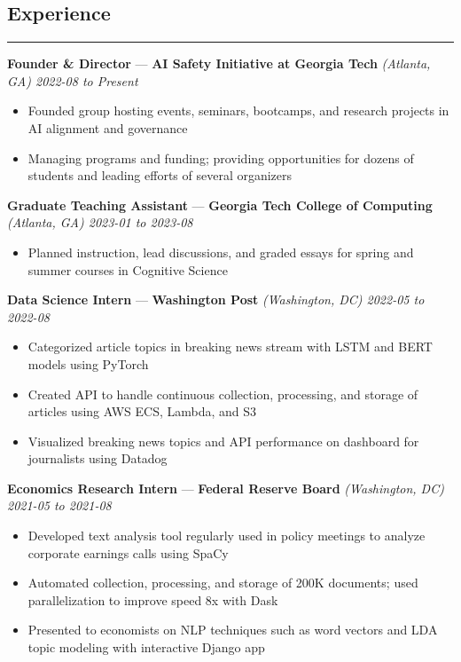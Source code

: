 \documentclass[10pt]{article}
\newcommand{\resumeHeading}[1]{
    \subsection*{#1}
    \hrule
    \vspace*{5pt}
}
\newcommand{\resumeSubHeading}[5]{
    \vspace*{5pt}
    \textbf{#1} — \textbf{#2} \textsl{(#3) \hfill #4 to #5}
}
\begin{document}

\resumeHeading{Experience \vspace{-2.5pt}}

\resumeSubHeading
    {Founder \& Director}
    {AI Safety Initiative at Georgia Tech}
    {Atlanta, GA}
    {2022-08}
    {Present}
\begin{itemize}
    \item Founded group hosting events, seminars, bootcamps, and research projects in AI alignment and governance
    \item Managing programs and funding; providing opportunities for dozens of students and leading efforts of several organizers
\end{itemize}

\resumeSubHeading
    {Graduate Teaching Assistant}
    {Georgia Tech College of Computing}
    {Atlanta, GA}
    {2023-01}
    {2023-08}
\begin{itemize}
    \item Planned instruction, lead discussions, and graded essays for spring and summer courses in Cognitive Science
\end{itemize}

\resumeSubHeading
    {Data Science Intern}
    {Washington Post}
    {Washington, DC}
    {2022-05}
    {2022-08}
\begin{itemize}
    \item Categorized article topics in breaking news stream with LSTM and BERT models using PyTorch
    \item Created API to handle continuous collection, processing, and storage of articles using AWS ECS, Lambda, and S3
    \item Visualized breaking news topics and API performance on dashboard for journalists using Datadog
\end{itemize}

\resumeSubHeading
    {Economics Research Intern}
    {Federal Reserve Board}
    {Washington, DC}
    {2021-05}
    {2021-08}
\begin{itemize}
    \item Developed text analysis tool regularly used in policy meetings to analyze corporate earnings calls using SpaCy
    \item Automated collection, processing, and storage of 200K documents; used parallelization to improve speed 8x with Dask
    \item Presented to economists on NLP techniques such as word vectors and LDA topic modeling with interactive Django app
\end{itemize}
\end{document}
